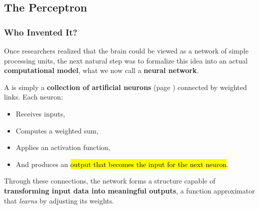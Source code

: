 \subsection{The Perceptron}

\subsubsection{Who Invented It?}

Once researchers realized that the brain could be viewed as a network of simple processing units, the next natural step was to formalize this idea into an actual \textbf{computational model}, what we now call a \textbf{neural network}.

\highspace
\begin{definitionbox}
    A  is simply a \textbf{collection of artificial neurons} (page \pageref{def:artificial-neuron}) connected by weighted links. Each neuron:
    \begin{itemize}
        \item Receives inputs,
        \item Computes a weighted sum,
        \item Applies an activation function,
        \item And produces an \hl{output that becomes the input for the next neuron}.
    \end{itemize}
    Through these connections, the network forms a structure capable of \textbf{transforming input data into meaningful outputs}, a function approximator that \emph{learns} by adjusting its weights.
\end{definitionbox}

